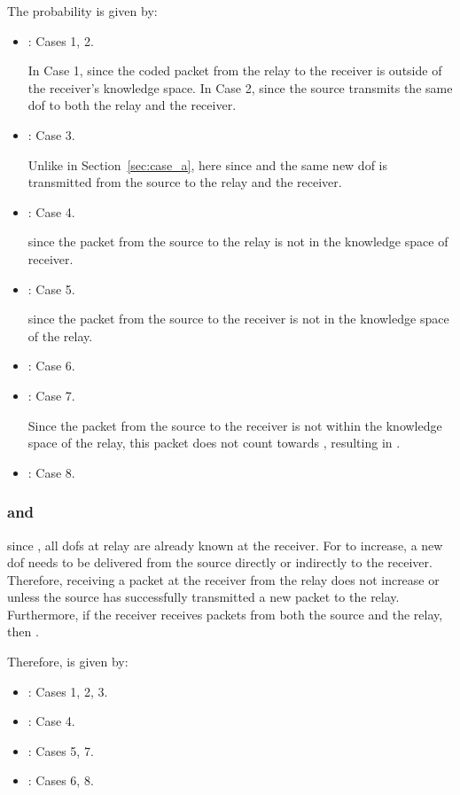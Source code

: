 The probability  is given by:
    \begin{itemize}
        \item : Cases 1, 2.

            In Case 1,  since the coded packet from the relay to the receiver is outside of the receiver's knowledge space. In Case 2,  since the source transmits the same dof to both the relay and the receiver. 

        \item : Case 3.
	
	    Unlike in Section~\ref{sec:case_a},  here since  and the same new dof is transmitted from the source to the relay and the receiver. 

        \item : Case 4.

             since the packet from the source to the relay is not in the knowledge space of receiver.

        \item : Case 5.

             since the packet from the source to the receiver is not in the knowledge space of the relay.

        \item : Case 6.
        \item : Case 7.

            Since the packet from the source to the receiver is not within the knowledge space of the relay, this packet does not count towards , resulting in . 
            
        \item : Case 8.
    \end{itemize}

\subsubsection{ and }
since , all dofs at relay are already known at the receiver. For  to increase, a new dof needs to be delivered from the source directly or indirectly to the receiver. Therefore, receiving a packet at the receiver from the relay does not increase  or  unless the source has successfully transmitted a new packet to the relay. Furthermore, if the receiver receives packets from both the source and the relay,  then .

Therefore,  is given by:

	    \begin{itemize}
            \item : Cases 1, 2, 3.
            \item : Case 4.
            \item : Cases 5, 7.
            \item : Cases 6, 8.
        \end{itemize}

